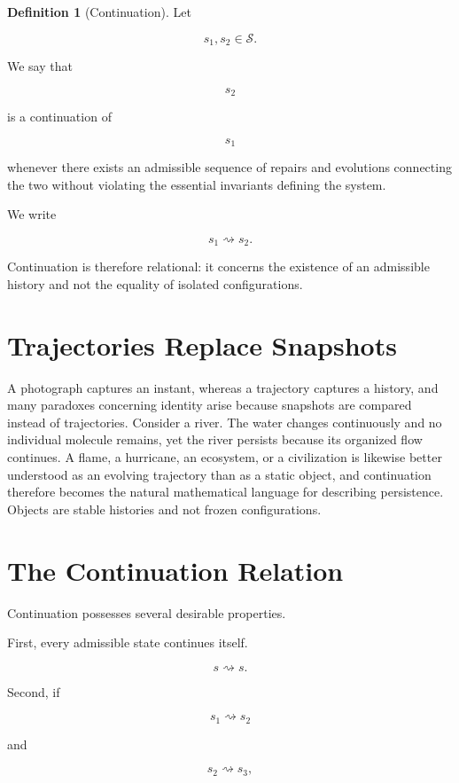\documentclass[11pt,oneside]{book}
\numberwithin{equation}{chapter}
\theoremstyle{definition}
\newtheorem{definition}{Definition}[chapter]
\theoremstyle{plain}
\newcommand{\State}{\mathcal{S}}
\begin{document}
\begin{definition}[Continuation]

Let

\[
s_1,s_2\in\State.
\]

We say that

\[
s_2
\]

is a continuation of

\[
s_1
\]

whenever there exists an admissible sequence of repairs and evolutions
connecting the two without violating the essential invariants defining the
system.

We write

\[
s_1 \rightsquigarrow s_2.
\]

\end{definition}

Continuation is therefore relational: it concerns the existence of an admissible history and not the equality of isolated configurations.

\section{Trajectories Replace Snapshots}

A photograph captures an instant, whereas a trajectory captures a history, and many paradoxes concerning identity arise because snapshots are compared instead of trajectories. Consider a river. The water changes continuously and no individual molecule remains, yet the river persists because its organized flow continues. A flame, a hurricane, an ecosystem, or a civilization is likewise better understood as an evolving trajectory than as a static object, and continuation therefore becomes the natural mathematical language for describing persistence. Objects are stable histories and not frozen configurations.

\section{The Continuation Relation}

Continuation possesses several desirable properties.

First, every admissible state continues itself.

\[
s \rightsquigarrow s.
\]

Second, if

\[
s_1 \rightsquigarrow s_2
\]

and

\[
s_2 \rightsquigarrow s_3,
\]
\end{document}
